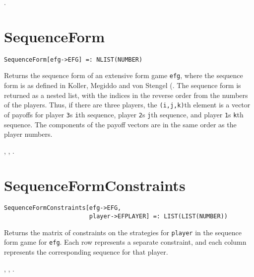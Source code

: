 \seealso {}.




\section*{SequenceForm}\label{PrimSequenceForm}
\begin{verbatim} 
SequenceForm[efg->EFG] =: NLIST(NUMBER)
\end{verbatim}

\noindent
Returns the sequence form of an extensive form game \verb+efg+, where
the sequence form is as defined in Koller, Megiddo and von Stengel
(\cite{KolMegSte:94}.  The sequence form is returned as a nested list,
with the indices in the reverse order from the numbers of the players.
Thus, if there are three players, the \verb+(i,j,k)+th element is a
vector of payoffs for player \verb+3+s \verb+i+th sequence, player
\verb+2+s \verb+j+th sequence, and player \verb+1+s \verb+k+th
sequence.  The components of the payoff vectors are in the same order
as the player numbers.

\seealso {},
,
.


\section*{SequenceFormConstraints}\label{PrimSequenceFormConstraints}
\begin{verbatim} 
SequenceFormConstraints[efg->EFG, 
                        player->EFPLAYER] =: LIST(LIST(NUMBER))
\end{verbatim}

\noindent
Returns the matrix of constraints on the strategies for
\verb+player+ in the sequence form game for \verb+efg+.  Each row
represents a separate constraint, and each column represents the
corresponding sequence for that player.

\seealso {},
,
.

